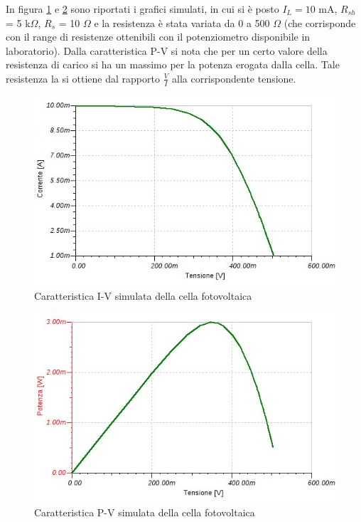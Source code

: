 \documentclass[journal, a4paper]{IEEEtran}
\begin{document}
In figura \ref{fig:ivchar} e \ref{fig:pvchar} sono riportati i grafici simulati, in cui si è posto $I_L = 10$ mA, $R_{sh}$ = 5 k$\Omega$, $R_s$ = 10 $\Omega$ e la resistenza è stata variata da 0 a 500 $\Omega$ (che corrisponde con il range di resistenze ottenibili con il potenziometro disponibile in laboratorio). Dalla caratteristica P-V si nota che per un certo valore della resistenza di carico si ha un massimo per la potenza erogata dalla cella. Tale resistenza la si ottiene dal rapporto $\frac{V}{I}$ alla corrispondente tensione.

\begin{figure}[htp]
\centering
\includegraphics[scale=.4]{ivchar1}
\caption{Caratteristica I-V simulata della cella fotovoltaica}
\label{fig:ivchar}
\end{figure}

\begin{figure}[htp]
\centering
\includegraphics[scale=.4]{pvchar1}
\caption{Caratteristica P-V simulata della cella fotovoltaica}
\label{fig:pvchar}
\end{figure}
\end{document}
